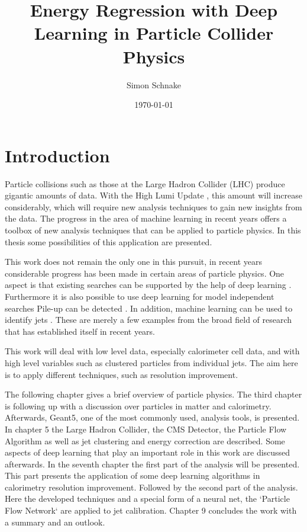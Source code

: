 \documentclass[12pt, a4paper]{thesis}
\author{Simon Schnake}
\date{\today}
\title{Energy Regression with Deep Learning in Particle Collider Physics}
\begin{document}


\tableofcontents
\cleardoublepage

\chapter{Introduction}
\label{sec:org1373fac}

Particle collisions such as those at the Large Hadron Collider (LHC)
\cite{lhc_machine} produce gigantic amounts of data. With the High
Lumi Update \cite{bruening19_high_lumin_large_hadron_collid}, this
amount will increase considerably, which will require new analysis
techniques to gain new insights from the data. The progress in the
area of machine learning in recent years offers a toolbox of new
analysis techniques that can be applied to particle physics. In this
thesis some possibilities of this application are presented.

This work does not remain the only one in this pursuit, in recent
years considerable progress has been made in certain areas of particle
physics. One aspect is that existing searches can be supported by the
help of deep learning
\cite{baldi14_searc_exotic_partic_high_energ,baldi15_enhan_higgs_boson_to_with_deep_learn,santos17_machin_learn_techn_searc_decay_chann}.
Furthermore it is also possible to use deep learning for model
independent searches
\cite{dagnolo19_learn_new_physic_from_machin,simone19_guidin_new_physic_searc_with_unsup_learn,heimel19_qcd_or_what}
Pile-up can be detected
\cite{komiske17_pileup_mitig_with_machin_learn_pumml}.  In addition,
machine learning can be used to identify jets
\cite{komiske19_energ_flow_networ,cogan15_jet_images,oliveira16_jet_images_deep_learn_edition,baldi16_jet_subst_class_high_energ,barnard17_parton_shower_uncer_jet_subst,kasieczka17_deep_learn_top_tagger_or_end_qcd,datta17_how_much_infor_is_jet,komiske17_deep_learn_color}.
These are merely a few examples from the broad field of research that
has established itself in recent years.

This work will deal with low level data, especially calorimeter cell data, and
with high level variables such as clustered particles from individual jets.  The
aim here is to apply different techniques, such as resolution improvement.

The following chapter gives a brief overview of particle physics. The
third chapter is following up with a discussion over particles in
matter and calorimetry. Afterwards, Geant5, one of the most commonly
used, analysis tools, is presented. In chapter 5 the Large Hadron
Collider, the CMS Detector, the Particle Flow Algorithm as well as jet
clustering and energy correction are described. Some aspects of deep
learning that play an important role in this work are discussed
afterwards. In the seventh chapter the first part of the analysis will
be presented. This part presents the application of some deep learning
algorithms in calorimetry resolution improvement. Followed by the
second part of the analysis. Here the developed techniques and a
special form of a neural net, the `Particle Flow Network` are applied
to jet calibration. Chapter 9 concludes the work with a summary and an
outlook.
\end{document}
